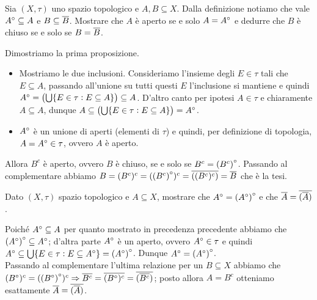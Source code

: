\begin{es}
  Sia $ (X, \tau) $ uno spazio topologico e $ A, B \subseteq X $. Dalla definizione notiamo che vale $ {A}^{\circ} \subseteq A $ e $ B \subseteq \overline{B} $. Mostrare che $ A $ è aperto se e solo $ A = {A}^{\circ} $ e dedurre che $ B $ è chiuso se e solo se $ B = \overline{B} $.
\end{es}
Dimostriamo la prima proposizione.
\begin{itemize}[label = $ \Rightarrow $]
\item Mostriamo le due inclusioni. Consideriamo l'insieme degli $ E \in \tau $ tali che $ E \subseteq A $, passando all'unione su tutti questi $ E $ l'inclusione si mantiene e quindi $ {A}^{\circ} = \left(\bigcup \{E \in \tau : E \subseteq A\}\right) \subseteq A $. D'altro canto per ipotesi $ A \in \tau $ e chiaramente $ A \subseteq A $, dunque $ A \subseteq \left(\bigcup \{E \in \tau : E \subseteq A\}\right) = {A}^{\circ}$.
\end{itemize}
\begin{itemize}[label = $ \Leftarrow $]
\item  $ {A}^{\circ} $ è un unione di aperti (elementi di $ \tau $) e quindi, per definizione di topologia, $ A = {A}^{\circ} \in \tau $, ovvero $ A $ è aperto.
\end{itemize}
Allora $ B^c $ è aperto, ovvero $ B $ è chiuso, se e solo se $ B^c = {(B^c)}^{\circ} $. Passando al complementare abbiamo $ B = (B^c)^c = ({(B^c)}^{\circ})^c = \overline{((B^c)^c)} = \overline{B} $ che è la tesi.

\begin{es}
  Dato $ (X, \tau) $ spazio topologico e $ A \subseteq X $, mostrare che $ {A}^{\circ} = {({A}^{\circ})}^{\circ} $ e che $ \overline{A} = \overline{(\overline{A})} $.
\end{es}
%
Poiché $ {A}^{\circ} \subseteq A $ per quanto mostrato in precedenza precedente abbiamo che $ {({A}^{\circ})}^{\circ} \subseteq {A}^{\circ} $; d'altra parte $ {A}^{\circ} $ è un aperto, ovvero $ {A}^{\circ} \in \tau $ e quindi $ {A}^{\circ} \subseteq \bigcup \{E \in \tau : E \subseteq {A}^{\circ}\} = {({A}^{\circ})}^{\circ} $. Dunque $ {A}^{\circ} = {({A}^{\circ})}^{\circ} $. \\
Passando al complementare l'ultima relazione per un $ B \subseteq X $ abbiamo che $ ({B}^{\circ})^c = ({({B}^{\circ})}^{\circ})^c \Rightarrow \overline{B^c} = \overline{({B}^{\circ})^c} = \overline{(\overline{B^c})} $; posto allora $ A = B^c $ otteniamo esattamente $ \overline{A} = \overline{(\overline{A})} $.

